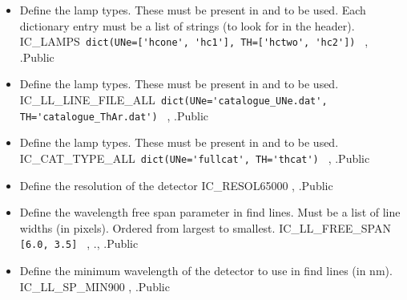 \begin{itemize}

\item {} 
{Define the lamp types. These must be present in  and  to be used. Each dictionary entry must be a list of strings (to look for in the header).}
{IC\_LAMPS}{\lstinline[style=pythoninline]| dict(UNe=['hcone', 'hc1'], TH=['hctwo', 'hc2']) |}
{\calHC, \calWAVE}{\constantsfile}{\spirouTHORCA.}{Public}

\item {} 
{Define the lamp types. These must be present in  and  to be used.}
{IC\_LL\_LINE\_FILE\_ALL}{\lstinline[style=pythoninline]| dict(UNe='catalogue_UNe.dat', TH='catalogue_ThAr.dat') |}
{\calHC, \calWAVE}{\constantsfile}{\spirouTHORCA.}{Public}

\item {} 
{Define the lamp types. These must be present in  and  to be used.}
{IC\_CAT\_TYPE\_ALL}{\lstinline[style=pythoninline]| dict(UNe='fullcat', TH='thcat') |}
{\calHC, \calWAVE}{\constantsfile}{\spirouTHORCA.}{Public}

\item {} 
{Define the resolution of the detector}
{IC\_RESOL}{65000}
{\calHC, \calWAVE}{\constantsfile}{\spirouTHORCA.}{Public}

\item {} 
{Define the wavelength free span parameter in find lines. Must be a list of line widths (in pixels). Ordered from largest to smallest.}
{IC\_LL\_FREE\_SPAN}{\lstinline[style=pythoninline]| [6.0, 3.5] |}
{\calHC, \calWAVE}{\constantsfile}{\spirouTHORCA., \spirouTHORCA.}{Public}

\item {} 
{Define the minimum wavelength of the detector to use in find lines (in nm).}
{IC\_LL\_SP\_MIN}{900}
{\calHC, \calWAVE}{\constantsfile}{\spirouTHORCA.}{Public}


\end{itemize}
